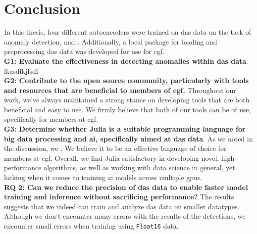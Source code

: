 \section{Conclusion}

In this thesis, four different autoencoders were trained on \acrshort{das} data on the task of anomaly detection, and . Additionally, a local package for loading and preprocessing \acrshort{das} data was developed for use for \acrfull{cgf}. \\ 


\textbf{G1: Evaluate the effectiveness in detecting anomalies within \acrshort{das} data}. lkasdfkjlsdf \\ 

\textbf{G2: Contribute to the open source community, particularly with tools and resources that are beneficial to members of \acrshort{cgf}.} Throughout our work, we've always maintained a strong stance on developing tools that are both beneficial and easy to use. We firmly believe that both of our tools can be of use, specifically for members at \acrshort{cgf}.  \\ 

\textbf{G3: Determine whether Julia is a suitable programming language for big data processing and \acrshort{ai}, specifically aimed at \acrshort{das} data}. As we noted in the discussion, we . We believe it to be an effective language of choice for members at \acrshort{cgf}. Overall, we find Julia satisfactory in developing novel, high performance algorithms, as well as working with data science in general, yet lacking when it comes to training \acrshort{ai} models across multiple \acrshort{gpu}s. \\

\textbf{RQ 2: Can we reduce the precision of \acrshort{das} data to enable faster model training and inference without sacrificing performance?} The results suggests that we indeed can train and analyze \acrshort{das} data on smaller datatypes. Although we don't encounter many errors with the results of the detections, we encounter small errors when training using \texttt{Float16} data. \\